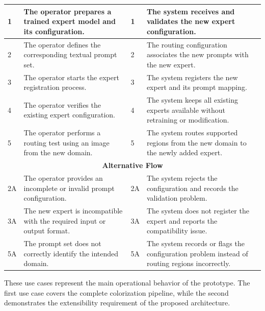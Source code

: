 \documentclass{FastFyp}
\begin{document}
\begin{longtable}{|p{0.7cm}|p{2.7cm}|p{3.5cm}|p{0.8cm}|p{5.7cm}|}
1 &
\multicolumn{2}{p{6.2cm}|}{
The operator prepares a trained expert model and its configuration.
} &
1 &
The system receives and validates the new expert configuration. \\ \hline

2 &
\multicolumn{2}{p{6.2cm}|}{
The operator defines the corresponding textual prompt set.
} &
2 &
The routing configuration associates the new prompts with the new expert. \\ \hline

3 &
\multicolumn{2}{p{6.2cm}|}{
The operator starts the expert registration process.
} &
3 &
The system registers the new expert and its prompt mapping. \\ \hline

4 &
\multicolumn{2}{p{6.2cm}|}{
The operator verifies the existing expert configuration.
} &
4 &
The system keeps all existing experts available without retraining or modification. \\ \hline

5 &
\multicolumn{2}{p{6.2cm}|}{
The operator performs a routing test using an image from the new domain.
} &
5 &
The system routes supported regions from the new domain to the newly added expert. \\ \hline

\multicolumn{5}{|c|}{\textbf{Alternative Flow}} \\ \hline

2A &
\multicolumn{2}{p{6.2cm}|}{
The operator provides an incomplete or invalid prompt configuration.
} &
2A &
The system rejects the configuration and records the validation problem. \\ \hline

3A &
\multicolumn{2}{p{6.2cm}|}{
The new expert is incompatible with the required input or output format.
} &
3A &
The system does not register the expert and reports the compatibility issue. \\ \hline

5A &
\multicolumn{2}{p{6.2cm}|}{
The prompt set does not correctly identify the intended domain.
} &
5A &
The system records or flags the configuration problem instead of routing regions incorrectly. \\ \hline

\end{longtable}

These use cases represent the main operational behavior of the prototype. The first use case covers the complete colorization pipeline, while the second demonstrates the extensibility requirement of the proposed architecture.
\end{document}
